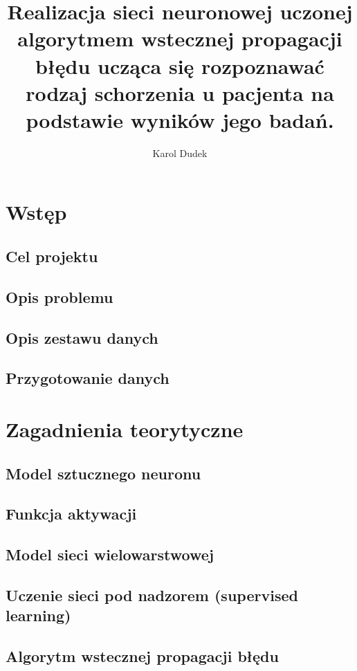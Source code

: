 \documentclass[12pt,twoside]{article}
\author{Karol Dudek}
\title{Realizacja sieci neuronowej uczonej algorytmem wstecznej propagacji błędu ucząca się rozpoznawać rodzaj schorzenia u pacjenta na podstawie wyników jego badań.}
\begin{document}
\maketitle

\blankpage

\tableofcontents

\clearpage
\blankpage

\section{Wstęp}
\subsection{Cel projektu}
\subsection{Opis problemu}
\subsection{Opis zestawu danych}
\subsection{Przygotowanie danych}

\clearpage

\section{Zagadnienia teorytyczne}
\subsection{Model sztucznego neuronu}
\subsection{Funkcja aktywacji}
\subsection{Model sieci wielowarstwowej}
\subsection{Uczenie sieci pod nadzorem (supervised learning)}
\subsection{Algorytm wstecznej propagacji błędu}
\end{document}
